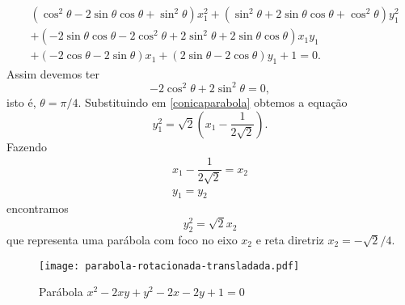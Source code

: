 \begin{exemplos}
\begin{enumerate}
\begin{solucao}
\begin{align}
        &(\cos^2\theta - 2\sin\theta\cos\theta + \sin^2\theta)x_1^2 + (\sin^2\theta + 2\sin\theta\cos\theta + \cos^2\theta)y_1^2\nonumber\\ &+ (-2\sin\theta\cos\theta - 2\cos^2\theta + 2\sin^2\theta + 2\sin\theta\cos\theta)x_1y_1\nonumber\\ &+ (-2\cos\theta - 2\sin\theta)x_1 + (2\sin\theta - 2\cos\theta)y_1 + 1 = 0.
      \end{align}
      Assim devemos ter
      \[
        -2\cos^2\theta + 2\sin^2\theta = 0,
      \]
      isto \'e, $\theta = \pi/4$. Substituindo em \eqref{conicaparabola} obtemos a equa\c{c}\~ao
      \[
        y_1^2 = \sqrt{2}\left(x_1 - \dfrac{1}{2\sqrt{2}}\right).
      \]
      Fazendo
      \begin{align*}
        x_1 - \dfrac{1}{2\sqrt{2}} = x_2\\
        y_1 = y_2
      \end{align*}
      encontramos
      \[
        y_2^2 = \sqrt{2}x_2
      \]
      que representa uma par\'abola com foco no eixo $x_2$ e reta diretriz $x_2 = -\sqrt{2}/4$.
      \begin{figure}[!h]
        \centering
        \caption{Par\'abola $x^2 - 2xy + y^2 - 2x - 2y + 1 = 0$}
        \texttt{[image: parabola-rotacionada-transladada.pdf]}
      \end{figure}
    \end{solucao}
  \end{enumerate}
\end{exemplos}




